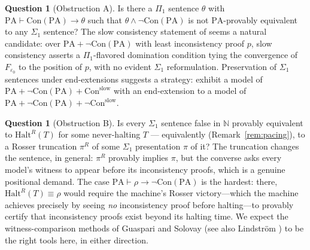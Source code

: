 \documentclass[11pt]{amsart}
\theoremstyle{definition}
\newtheorem{question}[theorem]{Question}
\theoremstyle{remark}
\newcommand{\PA}{\mathrm{PA}}
\newcommand{\Con}{\mathrm{Con}}
\newcommand{\N}{\mathbb{N}}
\begin{document}
\begin{question}[Obstruction A]\label{q:obstructionA}
Is there a $\Pi_1$ sentence $\theta$ with
$\PA\vdash\Con(\PA)\to\theta$ such that $\theta\wedge\neg\Con(\PA)$ is
not $\PA$-provably equivalent to any $\Sigma_1$ sentence? The slow
consistency statement of \cite{FRW2013} seems a natural candidate: over
$\PA+\neg\Con(\PA)$ with least inconsistency proof $p$, slow consistency
asserts a $\Pi_1$-flavored domination condition tying the convergence of
$F_{\varepsilon_0}$ to the position of $p$, with no evident $\Sigma_1$
reformulation. Preservation of $\Sigma_1$ sentences under end-extensions
suggests a strategy: exhibit a model of
$\PA+\neg\Con(\PA)+\mathrm{Con}^{\mathrm{slow}}$ with an end-extension
to a model of $\PA+\neg\Con(\PA)+\neg\mathrm{Con}^{\mathrm{slow}}$.
\end{question}

\begin{question}[Obstruction B]\label{q:obstructionB}
Is every $\Sigma_1$ sentence false in $\N$ provably equivalent to
$\mathrm{Halt}^R(T)$ for some never-halting $T$ --- equivalently
(Remark~\ref{rem:pacing}), to a Rosser truncation $\pi^R$ of some
$\Sigma_1$ presentation $\pi$ of it? The truncation changes the
sentence, in general:
$\pi^{R}$ provably implies $\pi$, but the converse asks every model's
witness to appear before its inconsistency proofs, which is a
genuine positional demand. The case
$\PA\vdash\rho\to\neg\Con(\PA)$ is the hardest: there,
$\mathrm{Halt}^R(T)\equiv\rho$ would require the machine's Rosser
victory---which the machine achieves precisely by seeing \emph{no}
inconsistency proof before halting---to provably certify that
inconsistency proofs exist beyond its halting time. We expect the
witness-comparison methods of Guaspari and Solovay
\cite{GuaspariSolovay1979} (see also Lindstr\"om
\cite{Lindstrom2003}) to be the right tools here, in either direction.
\end{question}
\end{document}
